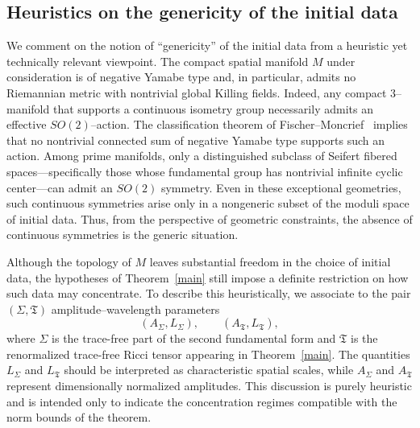\documentclass{amsart}
\begin{document}
\noindent \subsection{Heuristics on the genericity of the initial data}\label{genericity}
We comment on the notion of ``genericity'' of the initial data from a heuristic yet technically relevant viewpoint. The compact spatial manifold $M$ under consideration is of negative Yamabe type and, in particular, admits no Riemannian metric with nontrivial global Killing fields. Indeed, any compact $3$--manifold that supports a continuous isometry group necessarily admits an effective $SO(2)$--action. The classification theorem of Fischer--Moncrief~\cite{fischer1996quantum} implies that no nontrivial connected sum of negative Yamabe type supports such an action. Among prime manifolds, only a distinguished subclass of Seifert fibered spaces---specifically those whose fundamental group has nontrivial infinite cyclic center---can admit an $SO(2)$ symmetry. Even in these exceptional geometries, such continuous symmetries arise only in a nongeneric subset of the moduli space of initial data. Thus, from the perspective of geometric constraints, the absence of continuous symmetries is the generic situation.

\medskip

\noindent Although the topology of \(M\) leaves substantial freedom in the choice of initial data, the hypotheses of Theorem~\ref{main} still impose a definite restriction on how such data may concentrate. To describe this heuristically, we associate to the pair \((\Sigma,\mathfrak T)\) amplitude--wavelength parameters
\[
(A_{\Sigma},L_{\Sigma}),\qquad (A_{\mathfrak T},L_{\mathfrak T}),
\]
where \(\Sigma\) is the trace-free part of the second fundamental form and \(\mathfrak T\) is the renormalized trace-free Ricci tensor appearing in Theorem~\ref{main}. The quantities \(L_{\Sigma}\) and \(L_{\mathfrak T}\) should be interpreted as characteristic spatial scales, while \(A_{\Sigma}\) and \(A_{\mathfrak T}\) represent dimensionally normalized amplitudes. This discussion is purely heuristic and is intended only to indicate the concentration regimes compatible with the norm bounds of the theorem.
\end{document}
